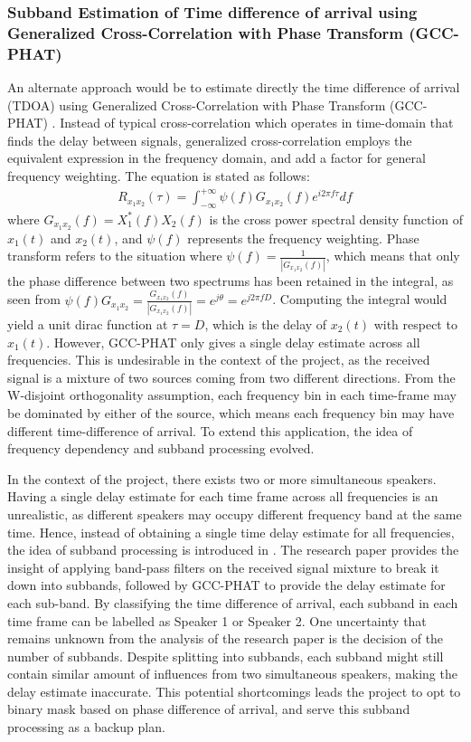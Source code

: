 \documentclass[a4paper,twoside,12pt,hidelinks]{article}
\begin{document}
\subsubsection{Subband Estimation of Time difference of arrival using Generalized Cross-Correlation with Phase Transform (GCC-PHAT)}
An alternate approach would be to estimate directly the time difference of arrival (TDOA) using Generalized Cross-Correlation with Phase Transform (GCC-PHAT) \cite{Knapp1976TheDelay}. Instead of typical cross-correlation which operates in time-domain that finds the delay between signals, generalized cross-correlation employs the equivalent expression in the frequency domain, and add a factor for general frequency weighting. The equation is stated as follows:
\begin{align}
R_{x_1x_2}(\tau) = \int^{+\infty}_{-\infty} \psi(f)G_{x_1x_2}(f)e^{i2\pi f\tau} df
\end{align}
where $G_{x_1x_2}(f) = X_1^*(f)X_2(f)$ is the cross power spectral density function of $x_1(t)$ and $x_2(t)$, and $\psi(f)$ represents the frequency weighting. Phase transform refers to the situation where $\psi(f)=\frac{1}{|G_{x_1x_2}(f)|}$, which means that only the phase difference between two spectrums has been retained in the integral, as seen from $\psi(f)G_{x_1x_2}=\frac{G_{x_1x_2}(f)}{|G_{x_1x_2}(f)|}=e^{j\theta}=e^{j2\pi fD}$. Computing the integral would yield a unit dirac function at $\tau =D$, which is the delay of $x_2(t)$ with respect to $x_1(t)$. However, GCC-PHAT only gives a single delay estimate across all frequencies. This is undesirable in the context of the project, as the received signal is a mixture of two sources coming from two different directions. From the W-disjoint orthogonality assumption, each frequency bin in each time-frame may be dominated by either of the source, which means each frequency bin may have different time-difference of arrival. To extend this application, the idea of frequency dependency and subband processing evolved.

In the context of the project, there exists two or more simultaneous speakers. Having a single delay estimate for each time frame across all frequencies is an unrealistic, as different speakers may occupy different frequency band at the same time. Hence, instead of obtaining a single time delay estimate for all frequencies, the idea of subband processing is introduced in \cite{Firoozabadi2014SubbandSpeakers}. The research paper provides the insight of applying band-pass filters on the received signal mixture to break it down into subbands, followed by GCC-PHAT to provide the delay estimate for each sub-band. By classifying the time difference of arrival, each subband in each time frame can be labelled as Speaker 1 or Speaker 2. One uncertainty that remains unknown from the analysis of the research paper is the decision of the number of subbands. Despite splitting into subbands, each subband might still contain similar amount of influences from two simultaneous speakers, making the delay estimate inaccurate. This potential shortcomings leads the project to opt to binary mask based on phase difference of arrival, and serve this subband processing as a backup plan.
\end{document}
